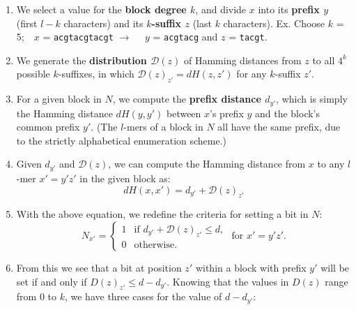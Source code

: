 \documentclass[oneside,12pt]{DISCSthesis}
\begin{document}
		\begin{enumerate}
			\item We select a value for the {\bf\boldmath block degree $k$}, and divide $x$ into its {\boldmath\bf prefix $y$} (first $l-k$ characters) and its {\boldmath\bf $k$-suffix $z$} (last $k$ characters).\newline
			{\small\hspace*{40pt}Ex. Choose $k$ = 5;\ \ $x$ = \texttt{acgtacgtacgt} $\rightarrow$ \ \  $y$ = \texttt{acgtacg} and $z$ = \texttt{tacgt}.}

			\item We generate the {\boldmath\bf distribution $\mathcal{D}(z)$} of Hamming distances from $z$ to all $4^{k}$ possible $k$-suffixes, in which $\mathcal{D}(z)_{z'} = dH(z,z')$ for any $k$-suffix $z'$.

			\item For a given block in $N$, we compute the {\boldmath\bf prefix distance $d_{y'}$}, which is simply the Hamming distance $dH(y,y')$ between $x$'s prefix $y$ and the block's common prefix $y'$. (The $l$-mers of a block in $N$ all have the same prefix, due to the strictly alphabetical enumeration scheme.)

			\item Given $d_{y'}$ and $\mathcal{D}(z)$, we can compute the Hamming distance from $x$ to any $l$-mer $x' = y'z'$ in the given block as:
			\begin{equation}
				dH(x,x') = d_{y'} + \mathcal{D}(z)_{z'}
				\end{equation}
			
			\item With the above equation, we redefine the criteria for setting a bit in $N$:
			\begin{equation*}
				N_{x'} = \left\{
				\begin{array}{rl}
					1 & \text{if } d_{y'} + \mathcal{D}(z)_{z'} \leq d,\\
					0 & \text{otherwise.}%
				\end{array} \right.
				\text{ for }x' = y'z'.
				\end{equation*}

			\item From this we see that a bit at position $z'$ within a block with prefix $y'$ will be set if and only if $D(z)_{z'} \leq d-d_{y'}$.
			Knowing that the values in $D(z)$ range from 0 to $k$, we have three cases for the value of $d-d_{y'}$:


\end{enumerate}
\end{document}
